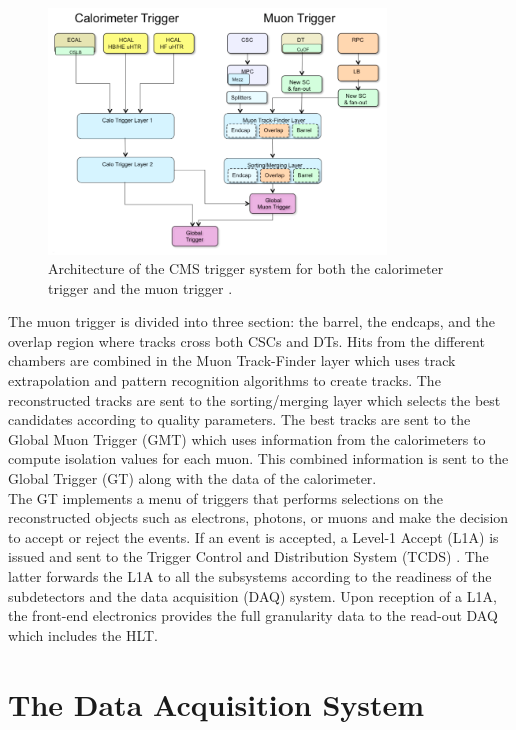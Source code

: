     \begin{figure}[t!]
      \centering
      \includegraphics[width=0.8\textwidth]{img/I-3-cms/l1.png}
      \caption{Architecture of the CMS trigger system for both the calorimeter trigger and the muon trigger \cite{Tapper:1556311}.}
      \label{fig:I-3-l1}
    \end{figure}

    The muon trigger is divided into three section: the barrel, the endcaps, and the overlap region where tracks cross both CSCs and DTs. Hits from the different chambers are combined in the Muon Track-Finder layer which uses track extrapolation and pattern recognition algorithms to create tracks. The reconstructed tracks are sent to the sorting/merging layer which selects the best candidates according to quality parameters. The best tracks are sent to the Global Muon Trigger (GMT) which uses information from the calorimeters to compute isolation values for each muon. This combined information is sent to the Global Trigger (GT) along with the data of the calorimeter. \\

    The GT implements a menu of triggers that performs selections on the reconstructed objects such as electrons, photons, or muons and make the decision to accept or reject the events. If an event is accepted, a Level-1 Accept (L1A) is issued and sent to the Trigger Control and Distribution System (TCDS) \cite{Tapper:1556311}. The latter forwards the L1A to all the subsystems according to the readiness of the subdetectors and the data acquisition (DAQ) system. Upon reception of a L1A, the front-end electronics provides the full granularity data to the read-out DAQ which includes the HLT.

  \section{The Data Acquisition System}
  \label{sec:I-3-daq}

